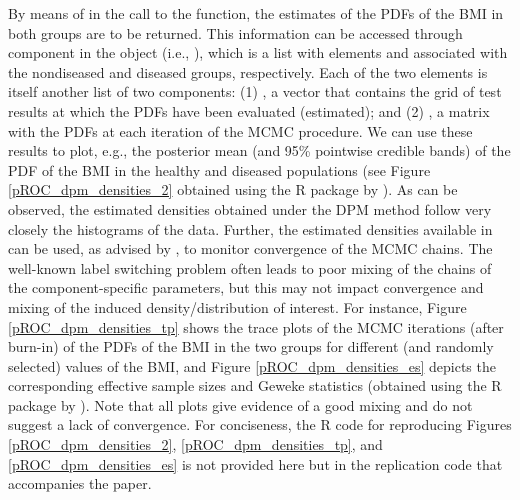 By means of  in the call to the function, the estimates of the PDFs of the BMI in both groups are to be returned. This information can be accessed through component  in the object  (i.e., ), which is a list with elements  and  associated with the nondiseased and diseased groups, respectively. Each of the two elements is itself another list of two components: (1) , a vector that contains the grid of test results at which the PDFs have been evaluated (estimated); and (2) , a matrix with the PDFs at each iteration of the MCMC procedure. We can use these results to plot, e.g., the posterior mean (and 95\% pointwise credible bands) of the PDF of the BMI in the healthy and diseased populations (see Figure \ref{pROC_dpm_densities_2} obtained using the R package  by \citealp{Wickham16}). As can be observed, the estimated densities obtained under the DPM method follow very closely the histograms of the data. Further, the estimated densities available in  can be used, as advised by \citet[p.~553]{Gelman2013}, to monitor convergence of the MCMC chains. The well-known label switching problem often leads to poor mixing of the chains of the component-specific parameters, but this may not impact convergence and mixing of the induced density/distribution of interest. For instance, Figure \ref{pROC_dpm_densities_tp} shows the trace plots of the MCMC iterations (after burn-in) of the PDFs of the BMI in the two groups for different (and randomly selected) values of the BMI, and Figure \ref{pROC_dpm_densities_es} depicts the corresponding effective sample sizes and Geweke statistics (obtained using the R package  by \citealp{coda06}). Note that all plots give evidence of a good mixing and do not suggest a lack of convergence. For conciseness, the R code for reproducing Figures \ref{pROC_dpm_densities_2}, \ref{pROC_dpm_densities_tp}, and \ref{pROC_dpm_densities_es} is not provided here but in the replication code that accompanies the paper. 


